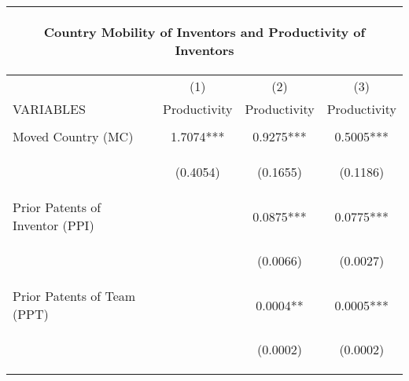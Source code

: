 \begin{center}
\begin{tabular}{lccc}
\multicolumn{4}{c}{\begin{large}Country Mobility of Inventors and Productivity of Inventors\end{large}} \\ \hline
 & (1) & (2) & (3) \\
VARIABLES & Productivity & Productivity & Productivity \\ \hline
\vspace{4pt} & \begin{footnotesize}\end{footnotesize} & \begin{footnotesize}\end{footnotesize} & \begin{footnotesize}\end{footnotesize} \\
Moved Country (MC) & 1.7074*** & 0.9275*** & 0.5005*** \\
\vspace{4pt} & \begin{footnotesize}(0.4054)\end{footnotesize} & \begin{footnotesize}(0.1655)\end{footnotesize} & \begin{footnotesize}(0.1186)\end{footnotesize} \\
Prior Patents of Inventor (PPI) &  & 0.0875*** & 0.0775*** \\
\vspace{4pt} & \begin{footnotesize}\end{footnotesize} & \begin{footnotesize}(0.0066)\end{footnotesize} & \begin{footnotesize}(0.0027)\end{footnotesize} \\
Prior Patents of Team (PPT) &  & 0.0004** & 0.0005*** \\
\vspace{4pt} & \begin{footnotesize}\end{footnotesize} & \begin{footnotesize}(0.0002)\end{footnotesize} & \begin{footnotesize}(0.0002)\end{footnotesize} \\

\end{tabular}
\end{center}

